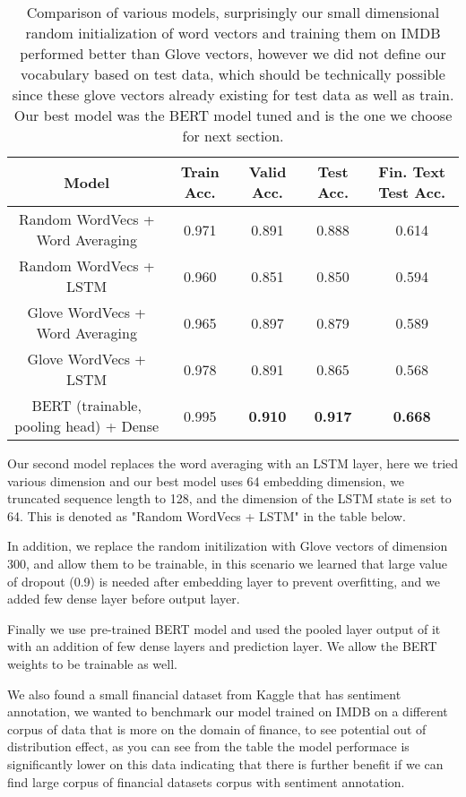 \documentclass{article}
\begin{document}
\begin{table}[b]
    \centering
    \begin{tabular}{c|c|c|c|c}
    \hline
        Model & Train Acc. & Valid Acc. & Test Acc. & Fin. Text Test Acc.  \\
        \hline
          Random WordVecs + Word Averaging & 0.971 & 0.891 & 0.888 & 0.614 \\
         \hline
          Random WordVecs + LSTM & 0.960 & 0.851 & 0.850 & 0.594 \\
         \hline
          Glove WordVecs + Word Averaging & 0.965 & 0.897 & 0.879 & 0.589 \\
         \hline
          Glove WordVecs + LSTM & 0.978 & 0.891 & 0.865 & 0.568 \\
         \hline
         BERT (trainable, pooling head) + Dense & 0.995 & {\bf 0.910} & {\bf 0.917} & {\bf 0.668} \\
         \hline
         
    \end{tabular}
    \caption{Comparison of various models, surprisingly our small dimensional random initialization
    of word vectors and training them on IMDB performed better than Glove vectors, however we did
    not define our vocabulary based on test data, which should be technically possible since
    these glove vectors already existing for test data as well as train. Our best model was
    the BERT model tuned and is the one we choose for next section.}
    \label{tab:my_label}
\end{table}

Our second model replaces the word averaging with an LSTM layer, here we tried various dimension
and our best model uses 64 embedding dimension, we truncated sequence length to 128, and the
dimension of the LSTM state is set to 64. This is denoted as "Random WordVecs + LSTM" in the table below.

In addition, we replace the random initilization with Glove vectors of dimension 300, and allow
them to be trainable, in this scenario we learned that large value of dropout (0.9) is
needed after embedding layer to prevent overfitting, and we added few dense layer before output layer.

Finally we use pre-trained BERT model and used the pooled layer output of it with an
addition of few dense layers and prediction layer. We allow the BERT weights to 
be trainable as well.

We also found a small financial dataset from Kaggle that has sentiment annotation, we wanted
to benchmark our model trained on IMDB on a different corpus of data that is more on
the domain of finance, to see potential out of distribution effect, as you can see 
from the table the model performace is significantly lower on this data indicating that
there is further benefit if we can find large corpus of financial datasets corpus with
sentiment annotation.
\end{document}
